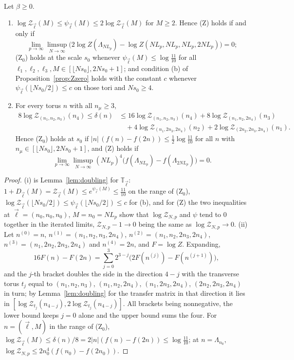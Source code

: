 \begin{proposition}\label{prop:Zdoubling}
Let $\beta\ge0$.
\begin{enumerate}[label=\textup{(\roman*)},leftmargin=*]
\item $\log\mathcal Z_{\vec\ell}(M)\le\psi_{\vec\ell}(M)\le2\log\mathcal
Z_{\vec\ell}(M)$ for $M\ge2$. Hence \textup{(Z)} holds if and only if
\[
\lim_{p\to\infty}\limsup_{N\to\infty}\bigl(2\log Z(\Lambda_{NL_p})-\log
Z(NL_p,NL_p,NL_p,2NL_p)\bigr)=0;
\]
\textup{(Z$_0$)} holds at the scale $s_0$ whenever $\psi_{\vec\ell}(M)\le
\log\frac{11}{10}$ for all $\ell_1,\ell_2,\ell_3,M\in[\lfloor Ns_0\rfloor,
2Ns_0+1]$; and condition \textup{(b)} of Proposition~\ref{prop:Zzero} holds
with the constant $c$ whenever $\psi_{\vec\ell}(\lfloor Ns_0/2\rfloor)\le c$
on those tori and $Ns_0\ge4$.
\item For every torus $n$ with all $n_\mu\ge3$,
\begin{align*}
8\log\mathcal Z_{(n_1,n_2,n_3)}(n_4)\le\delta(n)&\le16\log\mathcal
Z_{(n_1,n_2,n_3)}(n_4)+8\log\mathcal Z_{(n_1,n_2,2n_4)}(n_3)\\
&\quad+4\log\mathcal Z_{(n_1,2n_3,2n_4)}(n_2)+2\log\mathcal
Z_{(2n_2,2n_3,2n_4)}(n_1).
\end{align*}
Hence \textup{(Z$_0$)} holds at $s_0$ if $|n|\,(f(n)-f(2n))\le\frac12\log
\frac{11}{10}$ for all $n$ with $n_\mu\in[\lfloor Ns_0\rfloor,2Ns_0+1]$, and
\textup{(Z)} holds if
\[
\lim_{p\to\infty}\limsup_{N\to\infty}(NL_p)^4\bigl(f(\Lambda_{NL_p})-
f(\Lambda_{2NL_p})\bigr)=0 .
\]
\end{enumerate}
\end{proposition}

\begin{proof}
(i) is Lemma~\ref{lem:doubling} for $\mathbb T_{\vec\ell}$: $1+D_{\vec\ell}
(M)=\mathcal Z_{\vec\ell}(M)\le e^{\psi_{\vec\ell}(M)}\le\frac{11}{10}$ on the
range of (Z$_0$), $\log\mathcal Z_{\vec\ell}(\lfloor Ns_0/2\rfloor)\le\psi_{
\vec\ell}(\lfloor Ns_0/2\rfloor)\le c$ for (b), and for (Z) the two
inequalities at $\vec\ell=(n_0,n_0,n_0)$, $M=n_0=NL_p$ show that $\log
\mathcal Z_{N,p}$ and $\psi$ tend to $0$ together in the iterated limits,
$\mathcal Z_{N,p}-1\to0$ being the same as $\log\mathcal Z_{N,p}\to0$.
(ii) Let $n^{(0)}=n$, $n^{(1)}=(n_1,n_2,n_3,2n_4)$, $n^{(2)}=(n_1,n_2,2n_3,
2n_4)$, $n^{(3)}=(n_1,2n_2,2n_3,2n_4)$ and $n^{(4)}=2n$, and $F=\log Z$.
Expanding,
\[
16F(n)-F(2n)=\sum_{j=0}^{3}2^{3-j}\bigl(2F(n^{(j)})-F(n^{(j+1)})\bigr),
\]
and the $j$-th bracket doubles the side in the direction $4-j$ with the
transverse torus $t_j$ equal to $(n_1,n_2,n_3)$, $(n_1,n_2,2n_4)$, $(n_1,2n_3,
2n_4)$, $(2n_2,2n_3,2n_4)$ in turn; by Lemma~\ref{lem:doubling} for the
transfer matrix in that direction it lies in $[\log\mathcal Z_{t_j}(n_{4-j}),
2\log\mathcal Z_{t_j}(n_{4-j})]$. All brackets being nonnegative, the lower
bound keeps $j=0$ alone and the upper bound sums the four. For $n=(\vec\ell,
M)$ in the range of (Z$_0$), $\log\mathcal Z_{\vec\ell}(M)\le\delta(n)/8=2|n|
(f(n)-f(2n))\le\log\frac{11}{10}$; at $n=\Lambda_{n_0}$, $\log\mathcal Z_{N,p}
\le2n_0^4(f(n_0)-f(2n_0))$.
\end{proof}

